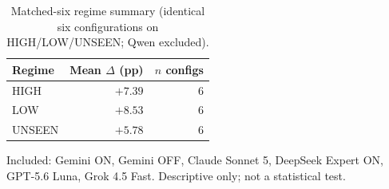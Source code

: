 \begin{table}[t]
\centering
\caption{Matched-six regime summary (identical six configurations on HIGH/LOW/UNSEEN; Qwen excluded).}
\label{tab:matched}
\begin{tabular}{@{}lrr@{}}
\toprule
\textbf{Regime} & \textbf{Mean $\Delta$ (pp)} & \textbf{$n$ configs} \\
\midrule
HIGH & $+7.39$ & 6 \\
LOW & $+8.53$ & 6 \\
UNSEEN & $+5.78$ & 6 \\
\bottomrule
\end{tabular}
\begin{flushleft}
\footnotesize
Included: Gemini ON, Gemini OFF, Claude Sonnet 5, DeepSeek Expert ON, GPT-5.6 Luna, Grok 4.5 Fast.
Descriptive only; not a statistical test.
\end{flushleft}
\end{table}

